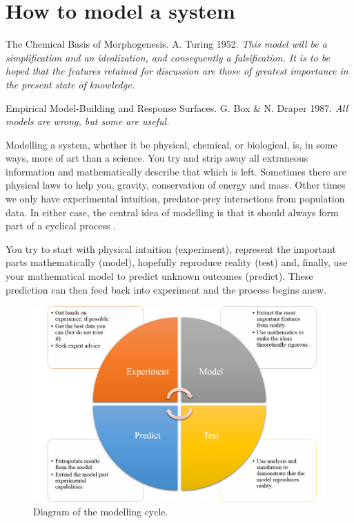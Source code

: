 \chapter{How to model a system}\label{How to model a system}
\begin{aquote}{The Chemical Basis of Morphogenesis. A. Turing 1952.}
\textit{This model will be a simplification and an idealization, and consequently a falsification. It is to be hoped that the features retained for discussion are those of greatest importance in the present state of knowledge.}
\end{aquote}
\begin{aquote}{Empirical Model-Building and Response Surfaces. G. Box \& N. Draper 1987.}
\textit{All models are wrong, but some are useful.}
\end{aquote}
Modelling a system, whether it be physical, chemical, or biological, is, in some ways, more of art than a science. You try and strip away all extraneous information and mathematically describe that which is left. Sometimes there are physical laws to help you, \eg gravity, conservation of energy and mass. Other times we only have experimental intuition, \eg predator-prey interactions from population data. In either case, the central idea of modelling is that it should always form part of a cyclical process .

You try to start with physical intuition (experiment), represent the important parts mathematically (model), hopefully reproduce reality (test) and, finally, use your mathematical model to predict unknown outcomes (predict). These prediction can then feed back into experiment and the process begins anew.
\begin{figure}[!!!h!!!tb]
\centering
\includegraphics[width=\tp]{../Pictures/Modelling_loop.png}
\caption{\label{Modelling_loop}Diagram of the modelling cycle.}
\end{figure}

